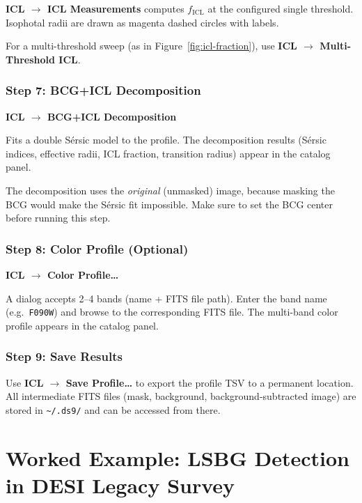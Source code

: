 \documentclass[11pt,fleqn]{book}
\begin{document}
\textbf{ICL $\rightarrow$ ICL Measurements} computes $f_\mathrm{ICL}$
at the configured single threshold.
Isophotal radii are drawn as magenta dashed circles with labels.

For a multi-threshold sweep (as in Figure~\ref{fig:icl-fraction}), use
\textbf{ICL $\rightarrow$ Multi-Threshold ICL}.

\subsection{Step 7: BCG+ICL Decomposition}

\textbf{ICL $\rightarrow$ BCG+ICL Decomposition}

Fits a double S\'ersic model to the profile. The decomposition results
(S\'ersic indices, effective radii, ICL fraction, transition radius)
appear in the catalog panel.

\begin{important}
  The decomposition uses the \emph{original} (unmasked) image,
  because masking the BCG would make the S\'ersic fit impossible.
  Make sure to set the BCG center before running this step.
\end{important}

\subsection{Step 8: Color Profile (Optional)}

\textbf{ICL $\rightarrow$ Color Profile\ldots}

A dialog accepts 2--4 bands (name + FITS file path).
Enter the band name (e.g.\ \texttt{F090W}) and browse to the corresponding
FITS file. The multi-band color profile appears in the catalog panel.

\subsection{Step 9: Save Results}

Use \textbf{ICL $\rightarrow$ Save Profile\ldots} to export the profile
TSV to a permanent location.
All intermediate FITS files (mask, background, background-subtracted image)
are stored in \texttt{\~{}/.ds9/} and can be accessed from there.


\chapter{Worked Example: LSBG Detection in DESI Legacy Survey}
\label{ch:example-lsbg}
\end{document}
